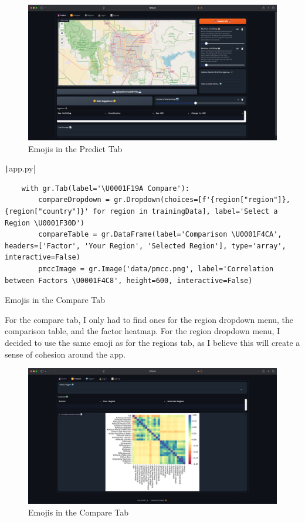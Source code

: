\documentclass[12pt]{report}
\newcommand{\pil}[1]{\protect\texttt|#1|}
\begin{document}
\begin{figure}[H]
\centering
\includegraphics[width=14cm]{ss22.8.png}
\caption{Emojis in the Predict Tab}\label{fig:ss22.8}
\end{figure}

\begin{listing}[H]
\pil{app.py}
\begin{verbatim}
    with gr.Tab(label='\U0001F19A Compare'):
        compareDropdown = gr.Dropdown(choices=[f'{region["region"]}, {region["country"]}' for region in trainingData], label='Select a Region \U0001F30D')
        compareTable = gr.DataFrame(label='Comparison \U0001F4CA', headers=['Factor', 'Your Region', 'Selected Region'], type='array', interactive=False)
        pmccImage = gr.Image('data/pmcc.png', label='Correlation between Factors \U0001F4C8', height=600, interactive=False)
\end{verbatim}
\caption{Emojis in the Compare Tab}\label{cs:emojis3}
\end{listing}

For the compare tab, I only had to find ones for the region dropdown menu, the comparison table, and the factor heatmap. For the region dropdown menu, I decided to use the same emoji as for the regions tab, as I believe this will create a sense of cohesion around the app.

\begin{figure}[H]
\centering
\includegraphics[width=14cm]{ss22.9.png}
\caption{Emojis in the Compare Tab}\label{fig:ss22.9}
\end{figure}
\end{document}
